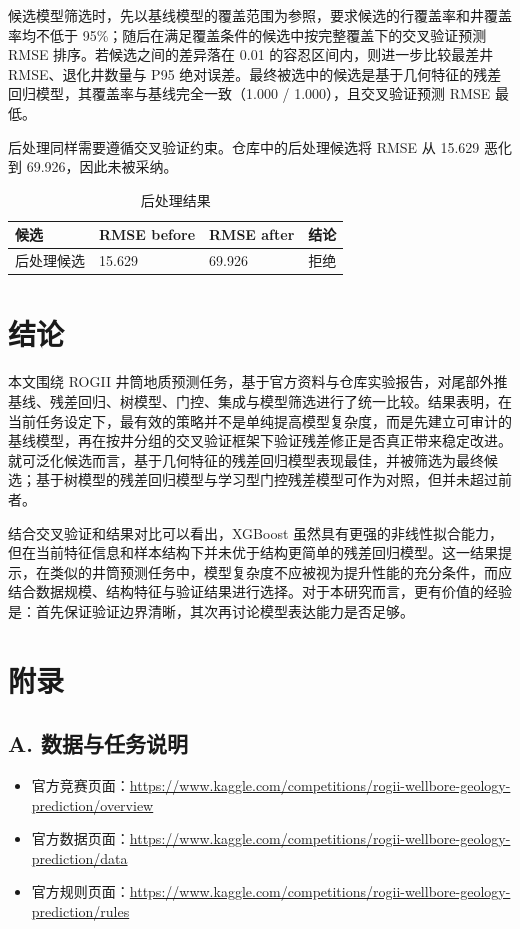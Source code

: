 \documentclass[openany]{Template_ECNU_Undergraduate_202505/ecnuundergraduate}
\newcommand{\appendixreset}[1]{%
  \setcounter{table}{0}%
  \setcounter{figure}{0}%
  \renewcommand{\thetable}{#1-\arabic{table}}%
  \renewcommand{\thefigure}{#1-\arabic{figure}}%
}
\begin{document}
候选模型筛选时，先以基线模型的覆盖范围为参照，要求候选的行覆盖率和井覆盖率均不低于 95\%；随后在满足覆盖条件的候选中按完整覆盖下的交叉验证预测 RMSE 排序。若候选之间的差异落在 0.01 的容忍区间内，则进一步比较最差井 RMSE、退化井数量与 P95 绝对误差。最终被选中的候选是基于几何特征的残差回归模型，其覆盖率与基线完全一致（1.000 / 1.000），且交叉验证预测 RMSE 最低。

后处理同样需要遵循交叉验证约束。仓库中的后处理候选将 RMSE 从 15.629 恶化到 69.926，因此未被采纳。

\begin{table}[H]
\centering
\small
\begin{tabular}{@{}p{4.5cm}p{2.4cm}p{2.4cm}p{3.8cm}@{}}
\toprule
候选 & RMSE before & RMSE after & 结论 \\
\midrule
后处理候选 & 15.629 & 69.926 & 拒绝 \\
\bottomrule
\end{tabular}
\caption{后处理结果}
\end{table}

\chapter{结论}
本文围绕 ROGII 井筒地质预测任务，基于官方资料与仓库实验报告，对尾部外推基线、残差回归、树模型、门控、集成与模型筛选进行了统一比较。结果表明，在当前任务设定下，最有效的策略并不是单纯提高模型复杂度，而是先建立可审计的基线模型，再在按井分组的交叉验证框架下验证残差修正是否真正带来稳定改进。就可泛化候选而言，基于几何特征的残差回归模型表现最佳，并被筛选为最终候选；基于树模型的残差回归模型与学习型门控残差模型可作为对照，但并未超过前者。

结合交叉验证和结果对比可以看出，XGBoost 虽然具有更强的非线性拟合能力，但在当前特征信息和样本结构下并未优于结构更简单的残差回归模型。这一结果提示，在类似的井筒预测任务中，模型复杂度不应被视为提升性能的充分条件，而应结合数据规模、结构特征与验证结果进行选择。对于本研究而言，更有价值的经验是：首先保证验证边界清晰，其次再讨论模型表达能力是否足够。

\chapter*{附录}

\section*{A. 数据与任务说明}
\appendixreset{A}
\begin{itemize}
  \item 官方竞赛页面：\url{https://www.kaggle.com/competitions/rogii-wellbore-geology-prediction/overview}
  \item 官方数据页面：\url{https://www.kaggle.com/competitions/rogii-wellbore-geology-prediction/data}
  \item 官方规则页面：\url{https://www.kaggle.com/competitions/rogii-wellbore-geology-prediction/rules}
\end{itemize}
\end{document}
